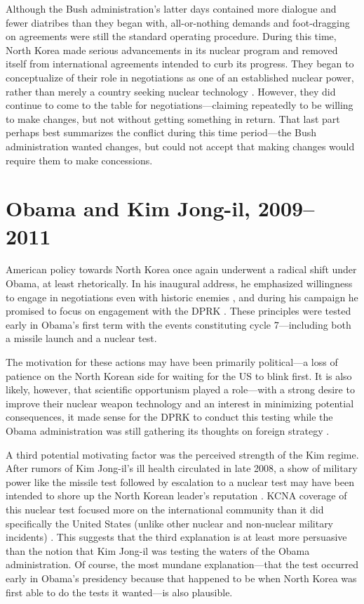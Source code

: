 Although the Bush administration's latter days contained more dialogue and fewer diatribes than they began with, all-or-nothing demands and foot-dragging on agreements were still the standard operating procedure. During this time, North Korea made serious advancements in its nuclear program and removed itself from international agreements intended to curb its progress. They began to conceptualize of their role in negotiations as one of an established nuclear power, rather than merely a country seeking nuclear technology \cite{hecker2}. However, they did continue to come to the table for negotiations---claiming repeatedly to be willing to make changes, but not without getting something in return. That last part perhaps best summarizes the conflict during this time period---the Bush administration wanted changes, but could not accept that making changes would require them to make concessions.

\section{Obama and Kim Jong-il, 2009--2011}

American policy towards North Korea once again underwent a radical shift under Obama, at least rhetorically. In his inaugural address, he emphasized willingness to engage in negotiations even with historic enemies \cite{obama}, and during his campaign he promised to focus on engagement with the DPRK \cite{delury}. These principles were tested early in Obama's first term with the events constituting cycle 7---including both a missile launch and a nuclear test.

The motivation for these actions may have been primarily political---a loss of patience on the North Korean side for waiting for the US to blink first. It is also likely, however, that scientific opportunism played a role---with a strong desire to improve their nuclear weapon technology and an interest in minimizing potential consequences, it made sense for the DPRK to conduct this testing while the Obama administration was still gathering its thoughts on foreign strategy \cite{hecker2}.

A third potential motivating factor was the perceived strength of the Kim regime. After rumors of Kim Jong-il's ill health circulated in late 2008, a show of military power like the missile test followed by escalation to a nuclear test may have been intended to shore up the North Korean leader's reputation \cite{hecker2}. KCNA coverage of this nuclear test focused more on the international community than it did specifically the United States (unlike other nuclear and non-nuclear military incidents) \cite{sin}. This suggests that the third explanation is at least more persuasive than the notion that Kim Jong-il was testing the waters of the Obama administration. Of course, the most mundane explanation---that the test occurred early in Obama's presidency because that happened to be when North Korea was first able to do the tests it wanted---is also plausible.

